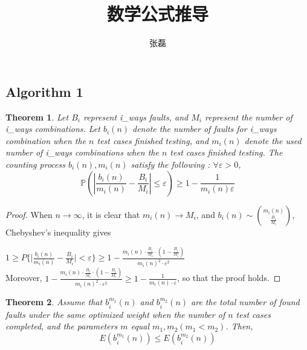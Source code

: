 \documentclass[10pt,journal,letterpaper,compsoc]{IEEEtran}
\date{}
\newtheorem{thm}{Theorem}[section]
\def\P{{\mathbb P}}
\begin{document}
\begin{CJK}{UTF8}{gkai}

\title{数学公式推导}
\author{张磊}
\maketitle
\section{Algorithm 1}
 \begin{thm}
Let $B_i$ represent i\_ways faults, and $M_i$ represent the number of i\_ways combinations.
Let $b_i(n)$ denote the number of faults for i\_ways combination when the $n$ test cases finished testing, 
and  $m_i(n)$ denote the used number of i\_ways combinations when the $n$ test cases finished testing.
The counting process $b_i(n),m_i(n)$ satisfy the following :
$\forall\varepsilon>0$,  
\begin{equation}  
\P(|\frac{b_i(n)}{m_i(n)} - \frac{B_i}{M_i}| \le \varepsilon )
        \geq {1-\frac{1}{m_i(n)\varepsilon}}
\end{equation}
\end{thm}

\begin{proof}
When $n\rightarrow \infty$, it is clear that $ m_i(n)\rightarrow M_i $, and $ b_i(n)\sim \binom{m_i(n)}
{\frac{B_i}{M_i}} $, Chebyshev's inequality gives 

$ 1 \geq P \{\vert \frac{b_i(n)}{m_i(n)} - 
\frac{B_i}{M_i}\vert < \varepsilon \}
\geq 1-\frac{m_i(n)\cdot \frac{B_i}{M_i} \cdot  (1-\frac{B_i}{M_i})}{m_i(n)^2\cdot \varepsilon^2} $
\\Moreover,
$1-\frac{m_i(n)\cdot \frac{B_i}{M_i} \cdot  (1-\frac{B_i}{M_i})}{m_i(n)^2\cdot \varepsilon^2}
\geq 1-\frac{1}{m_i(n) \cdot \varepsilon} $, so that the proof holds. 
\end{proof}

\begin{thm}
Assume that $b_i^{m_1}(n)$  and $b_i^{m_2}(n)$ are the total number of found faults under the same optimized weight
when the number of $n$ test cases completed, and the parameters $m$ equal  
$m_1,m_2(m_1<m_2)$. Then, 
\begin{equation}  
E(b_i^{m_1}(n)) \leq E(b_i^{m_2}(n)) 
\end{equation}
\end{thm}


\end{CJK}
\end{document}
